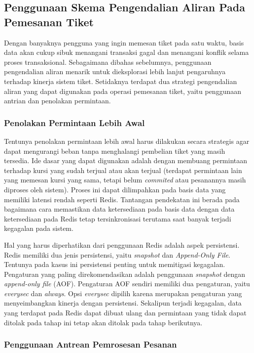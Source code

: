 \subsection{Penggunaan Skema Pengendalian Aliran Pada Pemesanan Tiket}

Dengan banyaknya pengguna yang ingin memesan tiket pada satu waktu, basis data akan cukup sibuk menangani transaksi gagal dan menangani konflik selama proses transaksional. Sebagaimana dibahas sebelumnya, penggunaan pengendalian aliran menarik untuk dieksplorasi lebih lanjut pengaruhnya terhadap kinerja sistem tiket. Setidaknya terdapat dua strategi pengendalian aliran yang dapat digunakan pada operasi pemesanan tiket, yaitu penggunaan antrian dan penolakan permintaan.

\subsubsection{Penolakan Permintaan Lebih Awal}

Tentunya penolakan permintaan lebih awal harus dilakukan secara strategis agar dapat mengurangi beban tanpa menghalangi pembelian tiket yang masih tersedia. Ide dasar yang dapat digunakan adalah dengan membuang permintaan terhadap kursi yang sudah terjual atau akan terjual (terdapat permintaan lain yang memesan kursi yang sama, tetapi belum \textit{commited} atau pesanannya masih diproses oleh sistem). Proses ini dapat dilimpahkan pada basis data yang memiliki latensi rendah seperti Redis. Tantangan pendekatan ini berada pada bagaimana cara memastikan data ketersediaan pada basis data dengan data ketersediaan pada Redis tetap tersinkronisasi terutama saat banyak terjadi kegagalan pada sistem.

Hal yang harus diperhatikan dari penggunaan Redis adalah aspek persistensi. Redis memiliki dua jenis persistensi, yaitu \textit{snapshot} dan \textit{Append-Only File}. Tentunya pada kasus ini persistensi penting untuk memitigasi kegagalan. Pengaturan yang paling direkomendasikan adalah penggunaan \textit{snapshot} dengan \textit{append-only file} (AOF). Pengaturan AOF sendiri memiliki dua pengaturan, yaitu \textit{everysec} dan \textit{always}. Opsi \textit{everysec} dipilih karena merupakan pengaturan yang menyeimbangkan kinerja dengan persistensi. Sekalipun terjadi kegagalan, data yang terdapat pada Redis dapat dibuat ulang dan permintaan yang tidak dapat ditolak pada tahap ini tetap akan ditolak pada tahap berikutnya.

\subsubsection{Penggunaan Antrean Pemrosesan Pesanan}

